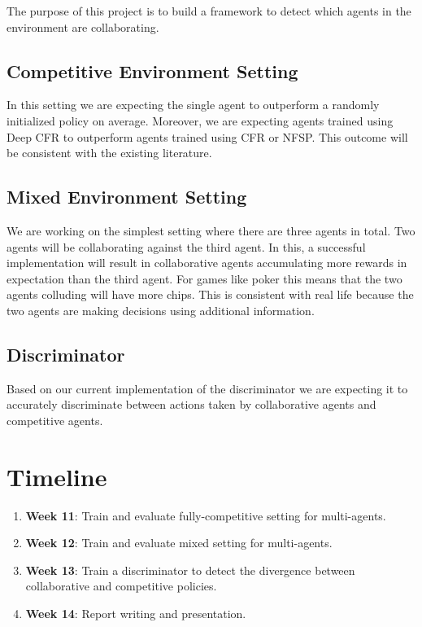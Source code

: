 \documentclass{article}
\begin{document}

The purpose of this project is to build a framework to detect which agents in the environment are collaborating. 

\subsection{Competitive Environment Setting} 
In this setting we are expecting the single agent to outperform a randomly initialized policy on average. Moreover, we are expecting agents trained using Deep CFR to outperform agents trained using CFR or NFSP. This outcome will be consistent with the existing literature.

\subsection{Mixed Environment Setting}
We are working on the simplest setting where there are three agents in total. Two agents will be collaborating against the third agent. In this, a successful implementation will result in collaborative agents accumulating more rewards in expectation than the third agent. For games like poker this means that the two agents colluding will have more chips. This is consistent with real life because the two agents are making decisions using additional information.

\subsection{Discriminator}
Based on our current implementation of the discriminator we are expecting it to accurately discriminate between actions taken by collaborative agents and competitive agents.

\newpage 

\section{Timeline}

\begin{enumerate}
    \item \textbf{Week 11}: Train and evaluate fully-competitive setting for multi-agents.

    \item \textbf{Week 12}: Train and evaluate mixed setting for multi-agents. 

    \item \textbf{Week 13}: Train a discriminator to detect the divergence between collaborative and competitive policies.

    \item \textbf{Week 14}: Report writing and presentation.
\end{enumerate}

\newpage





\end{document}

